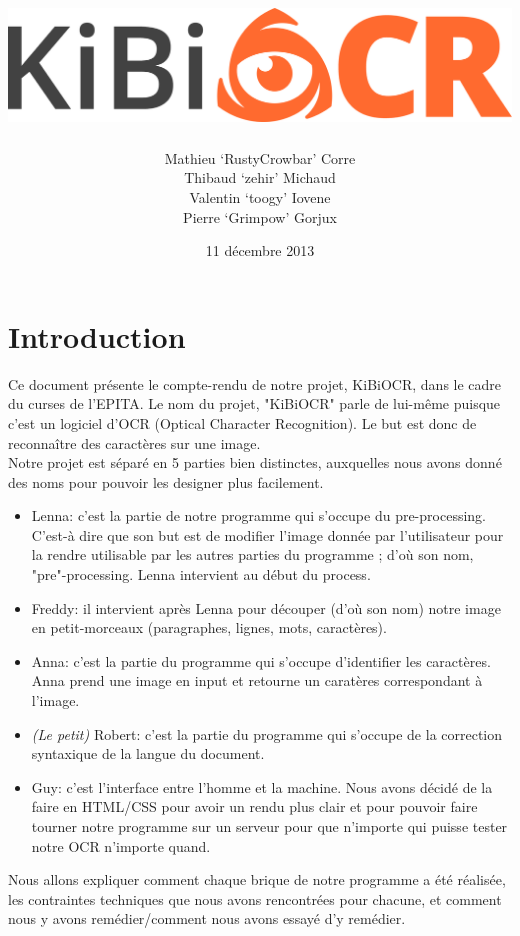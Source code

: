 \documentclass[12pt]{report}
\title{\includegraphics[scale=0.55]{chapters/Pictures/kibi.png}}
\author{Mathieu `RustyCrowbar' Corre \\
        Thibaud `zehir' Michaud \\
        Valentin `toogy' Iovene \\
        Pierre `Grimpow' Gorjux
      }
\date{11 décembre 2013}
\begin{document}
\maketitle

\tableofcontents

\chapter*{Introduction}

Ce document présente le compte-rendu de notre projet, KiBiOCR, dans le cadre du
curses de l'EPITA. Le nom du projet, "KiBiOCR" parle de lui-même puisque c'est
un logiciel d'OCR (Optical Character Recognition). Le but est donc de
reconnaître des caractères sur une image. \\

Notre projet est séparé en 5 parties bien distinctes, auxquelles nous avons
donné des noms pour pouvoir les designer plus facilement.

\begin{itemize}
    \item{Lenna}: c'est la partie de notre programme qui s'occupe du
      pre-processing. C'est-à dire que son but est de modifier l'image donnée
      par l'utilisateur pour la rendre utilisable par les autres parties du
      programme ; d'où son nom, "pre"-processing. Lenna intervient au début du
      process. 
    \item{Freddy}: il intervient après Lenna pour découper (d'où son nom) notre
      image en petit-morceaux (paragraphes, lignes, mots, caractères).
    \item{Anna}: c'est la partie du programme qui s'occupe d'identifier les
      caractères. Anna prend une image en input et retourne un caratères
      correspondant à l'image.
    \item{\emph{(Le petit)} Robert}: c'est la partie du programme qui s'occupe
      de la correction syntaxique de la langue du document. 
    \item{Guy}: c'est l'interface entre l'homme et la machine. Nous avons décidé
      de la faire en HTML/CSS pour avoir un rendu plus clair et pour pouvoir
      faire tourner notre programme sur un serveur pour que n'importe qui puisse
      tester notre OCR n'importe quand.
\end{itemize}

Nous allons expliquer comment chaque brique de notre programme a été réalisée,
les contraintes techniques que nous avons rencontrées pour chacune, et comment
nous y avons remédier/comment nous avons essayé d'y remédier. \\
\end{document}
